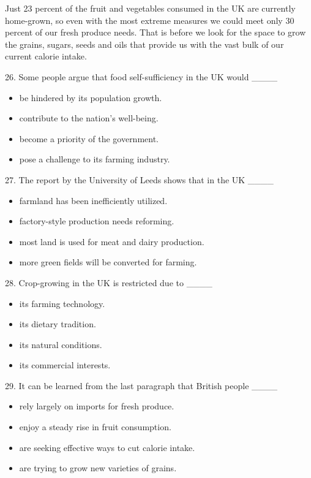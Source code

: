 \documentclass[UTF8,11pt]{ctexart}
\begin{document}
Just 23 percent of the fruit and vegetables consumed in the UK are currently home-grown, so even with the most extreme measures we could meet only 30 percent of our fresh produce needs. That is before we look for the space to grow the grains, sugars, seeds and oils that provide us with the vast bulk of our current calorie intake.


26. Some people argue that food self-sufficiency in the UK would \_\_\_\_


\begin{itemize}[leftmargin=2em,itemsep=.2em,topsep=.4em]\item[A.] be hindered by its population growth.
\item[B.] contribute to the nation’s well-being.
\item[C.] become a priority of the government.
\item[D.] pose a challenge to its farming industry.
\end{itemize}

27. The report by the University of Leeds shows that in the UK \_\_\_\_


\begin{itemize}[leftmargin=2em,itemsep=.2em,topsep=.4em]\item[A.] farmland has been inefficiently utilized.
\item[B.] factory-style production needs reforming.
\item[C.] most land is used for meat and dairy production.
\item[D.] more green fields will be converted for farming.
\end{itemize}

28. Crop-growing in the UK is restricted due to \_\_\_\_


\begin{itemize}[leftmargin=2em,itemsep=.2em,topsep=.4em]\item[A.] its farming technology.
\item[B.] its dietary tradition.
\item[C.] its natural conditions.
\item[D.] its commercial interests.
\end{itemize}

29. It can be learned from the last paragraph that British people \_\_\_\_


\begin{itemize}[leftmargin=2em,itemsep=.2em,topsep=.4em]\item[A.] rely largely on imports for fresh produce.
\item[B.] enjoy a steady rise in fruit consumption.
\item[C.] are seeking effective ways to cut calorie intake.
\item[D.] are trying to grow new varieties of grains.
\end{itemize}
\end{document}
